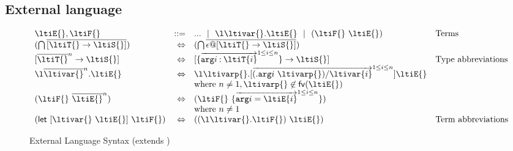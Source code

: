 \subsection{External language}

\begin{figure}
$$
\begin{array}{lrll}
  \ltiE{}, \ltiF{} &::=& ... \alt \ltiufun{\ltivar{}}{\ltiE{}}
                         \alt \ltiapp{\ltiF{}}{\ltiE{}}
                      &\mbox{Terms} \\
  \ltiIFn{\ova{\ltiFn{\ltiT{}}{\ltiS{}}}} &\Leftrightarrow& \ltiIFn{\ova{\ltiContextualFn{\ltiEmptyEnv}{\ltiT{}}{\ltiS{}}}}
  \\
  \ltiFn{\ova{\ltiT{}}^n}{\ltiS{}} &\Leftrightarrow&
  \ltiFn{\ltiRec{\overrightarrowcaption{\hastype{\texttt{arg}i}{\ltiT{i}}}^{1 \leq i \leq n}}}{\ltiS{}}
                      &\mbox{Type abbreviations} \\
  \ltiufun{\ova{\ltivar{}}^n}{\ltiE{}} &\Leftrightarrow&
  \ltiufun{\ltivarp{}}{\ltireplaceoverrightarrowcaption{\ltisel{\ltivarp{}}{\texttt{arg}i}}{\ltivar{i}}{1 \leq i \leq n}{\ltiE{}}}
  \\
  && \text{where } n \not= 1, \ltivarp{} \not\in \ltifvLHS{\ltiE{}}
  \\
  \ltiapp{\ltiF{}}{\ova{\ltiE{}}^n} &\Leftrightarrow&
  \ltiapp{\ltiF{}}{\ltiRec{\overrightarrowcaption{\texttt{arg}i = \ltiE{i}}^{1 \leq i \leq n}}}
  \\
  && \text{where } n \not= 1
  \\
  \ltilet{\ltivar{}}{\ltiE{}}{\ltiF{}} &\Leftrightarrow& \ltiapp{(\ltiufun{\ltivar{}}{\ltiF{}})}{\ltiE{}}
                      &\mbox{Term abbreviations}
\end{array}
$$
\caption{External Language Syntax
  (extends )
  }
\label{symbolic:figure:external-language-syntax}
\end{figure}

